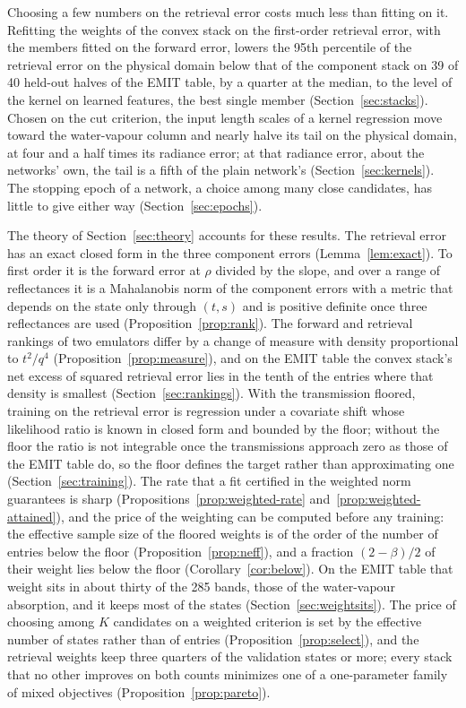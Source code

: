 \documentclass[11pt]{article}
\theoremstyle{remark}
\newcommand{\1}{\mathbf{1}}
\begin{document}
Choosing a few numbers on the retrieval error costs much less than fitting on it. Refitting the weights of the convex
stack on the first-order retrieval error, with the members fitted on the forward error, lowers the 95th percentile of
the retrieval error on the physical domain below that of the component stack on 39 of 40 held-out halves of the EMIT
table, by a quarter at the median, to the level of the kernel on learned features, the best single member
(Section~\ref{sec:stacks}). Chosen on the cut criterion, the input length scales of a kernel regression move toward the
water-vapour column and nearly halve its tail on the physical domain, at four and a half times its radiance error; at
that radiance error, about the networks' own, the tail is a fifth of the plain network's (Section~\ref{sec:kernels}).
The stopping epoch of a network, a choice among many close candidates, has little to give either way
(Section~\ref{sec:epochs}).

The theory of Section~\ref{sec:theory} accounts for these results. The retrieval error has an exact closed form in the
three component errors (Lemma~\ref{lem:exact}). To first order it is the forward error at $\rho$ divided by the slope,
and over a range of reflectances it is a Mahalanobis norm of the component errors with a metric that depends on the
state only through $(t,s)$ and is positive definite once three reflectances are used (Proposition~\ref{prop:rank}). The
forward and retrieval rankings of two emulators differ by a change of measure with density proportional to $t^2/q^4$
(Proposition~\ref{prop:measure}), and on the EMIT table the convex stack's net excess of squared retrieval error lies in
the tenth of the entries where that density is smallest (Section~\ref{sec:rankings}). With the transmission floored,
training on the retrieval error is regression under a covariate shift whose likelihood ratio is known in closed form and
bounded by the floor; without the floor the ratio is not integrable once the transmissions approach zero as those of
the EMIT table do, so the floor defines the target rather than approximating one (Section~\ref{sec:training}). The rate
that a fit certified in the weighted
norm guarantees is sharp (Propositions~\ref{prop:weighted-rate} and~\ref{prop:weighted-attained}), and the price of the
weighting can be computed before any training: the effective sample size of the floored weights is of the order of the
number of entries below the floor (Proposition~\ref{prop:neff}), and a fraction $(2-\beta)/2$ of their weight lies below
the floor (Corollary~\ref{cor:below}). On the EMIT table that weight sits in about thirty of the 285 bands, those of the
water-vapour absorption, and it keeps most of the states (Section~\ref{sec:weightsits}). The price of choosing among $K$
candidates on a weighted criterion is set by the effective number of states rather than of entries
(Proposition~\ref{prop:select}), and the retrieval weights keep three quarters of the validation states or more; every
stack that no other improves on both counts minimizes one of a one-parameter family of mixed objectives
(Proposition~\ref{prop:pareto}).
\end{document}
